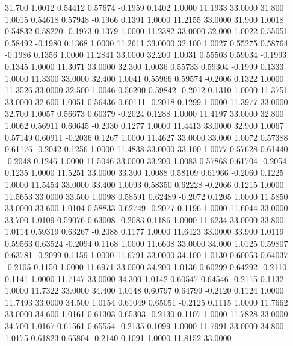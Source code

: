   31.700   1.0012   0.54412   0.57674  -0.1959   0.1402   1.0000  11.1933  33.0000
  31.800   1.0015   0.54618   0.57948  -0.1966   0.1391   1.0000  11.2155  33.0000
  31.900   1.0018   0.54832   0.58220  -0.1973   0.1379   1.0000  11.2382  33.0000
  32.000   1.0022   0.55051   0.58492  -0.1980   0.1368   1.0000  11.2611  33.0000
  32.100   1.0027   0.55275   0.58764  -0.1986   0.1356   1.0000  11.2841  33.0000
  32.200   1.0031   0.55503   0.59034  -0.1993   0.1345   1.0000  11.3071  33.0000
  32.300   1.0036   0.55733   0.59304  -0.1999   0.1333   1.0000  11.3300  33.0000
  32.400   1.0041   0.55966   0.59574  -0.2006   0.1322   1.0000  11.3526  33.0000
  32.500   1.0046   0.56200   0.59842  -0.2012   0.1310   1.0000  11.3751  33.0000
  32.600   1.0051   0.56436   0.60111  -0.2018   0.1299   1.0000  11.3977  33.0000
  32.700   1.0057   0.56673   0.60379  -0.2024   0.1288   1.0000  11.4197  33.0000
  32.800   1.0062   0.56911   0.60645  -0.2030   0.1277   1.0000  11.4413  33.0000
  32.900   1.0067   0.57149   0.60911  -0.2036   0.1267   1.0000  11.4627  33.0000
  33.000   1.0072   0.57388   0.61176  -0.2042   0.1256   1.0000  11.4838  33.0000
  33.100   1.0077   0.57628   0.61440  -0.2048   0.1246   1.0000  11.5046  33.0000
  33.200   1.0083   0.57868   0.61704  -0.2054   0.1235   1.0000  11.5251  33.0000
  33.300   1.0088   0.58109   0.61966  -0.2060   0.1225   1.0000  11.5454  33.0000
  33.400   1.0093   0.58350   0.62228  -0.2066   0.1215   1.0000  11.5653  33.0000
  33.500   1.0098   0.58591   0.62489  -0.2072   0.1205   1.0000  11.5850  33.0000
  33.600   1.0104   0.58833   0.62749  -0.2077   0.1196   1.0000  11.6044  33.0000
  33.700   1.0109   0.59076   0.63008  -0.2083   0.1186   1.0000  11.6234  33.0000
  33.800   1.0114   0.59319   0.63267  -0.2088   0.1177   1.0000  11.6423  33.0000
  33.900   1.0119   0.59563   0.63524  -0.2094   0.1168   1.0000  11.6608  33.0000
  34.000   1.0125   0.59807   0.63781  -0.2099   0.1159   1.0000  11.6791  33.0000
  34.100   1.0130   0.60053   0.64037  -0.2105   0.1150   1.0000  11.6971  33.0000
  34.200   1.0136   0.60299   0.64292  -0.2110   0.1141   1.0000  11.7147  33.0000
  34.300   1.0142   0.60547   0.64546  -0.2115   0.1132   1.0000  11.7322  33.0000
  34.400   1.0148   0.60797   0.64799  -0.2120   0.1124   1.0000  11.7493  33.0000
  34.500   1.0154   0.61049   0.65051  -0.2125   0.1115   1.0000  11.7662  33.0000
  34.600   1.0161   0.61303   0.65303  -0.2130   0.1107   1.0000  11.7828  33.0000
  34.700   1.0167   0.61561   0.65554  -0.2135   0.1099   1.0000  11.7991  33.0000
  34.800   1.0175   0.61823   0.65804  -0.2140   0.1091   1.0000  11.8152  33.0000
